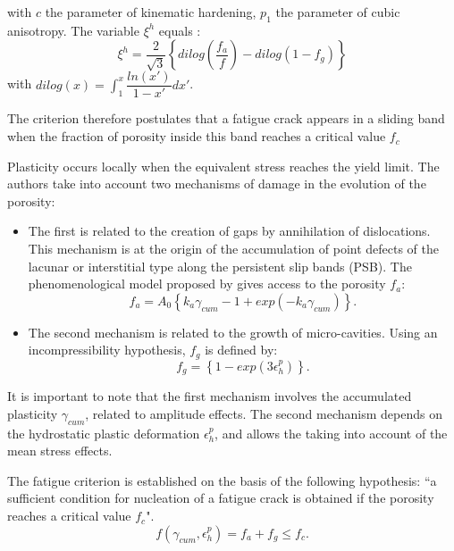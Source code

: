 with $c$ the parameter of kinematic hardening, $p_1$ the parameter of cubic anisotropy.
The variable $\xi^h$ equals :
\begin{equation}
\xi^h=\dfrac{2}{\sqrt{3}}\left\lbrace dilog\left(\dfrac{f_a}{f}\right) -dilog\left(1-f_g \right)  \right\rbrace 
\label{eq.monchiet16}
\end{equation}
with $dilog(x)=\int_{1}^{x}\dfrac{ln(x')}{1-x'}dx'$.

The criterion therefore postulates that a fatigue crack appears in a sliding band when the fraction of porosity inside this band reaches a critical value $f_c$

Plasticity occurs locally when the equivalent stress reaches the yield limit. The authors take into account two mechanisms of damage in the evolution of the porosity:

\vspace{6pt}
\begin{itemize}
	\item  The first is related to the creation of gaps by annihilation of dislocations. This mechanism is at the origin of the accumulation of point defects of the lacunar or interstitial type along the persistent slip bands (PSB). The phenomenological model proposed by \cite{essmann1979annihilation} gives access to the porosity $f_a$:
	\begin{equation}
	f_a= A_0\left\lbrace k_a\gamma_{cum}-1+exp\left(-k_a\gamma_{cum} \right)  \right\rbrace .
	\label{eq.monchiet2}
	\end{equation}
	
	\item  The second mechanism is related to the growth of micro-cavities. Using an incompressibility hypothesis, $f_g$ is defined by:
	\begin{equation}
	f_g=\left\lbrace 1-exp\left(3\epsilon_h^p \right) \right\rbrace.
	\label{eq.monchiet3}
	\end{equation}
\end{itemize}

It is important to note that the first mechanism involves the accumulated plasticity $\gamma_{cum}$, related to amplitude effects. The second mechanism depends on the hydrostatic plastic deformation $\epsilon_h^p$, and allows the taking into account of the mean stress effects.

The fatigue criterion is established on the basis of the following hypothesis: ``a sufficient condition for nucleation of a fatigue crack is obtained if the porosity reaches a critical value $f_c$".
\begin{equation}
f\left( \gamma_{cum},\epsilon_h^p\right) =f_a+f_g\leqslant f_c.
\label{eq.monchiet4}
\end{equation}

